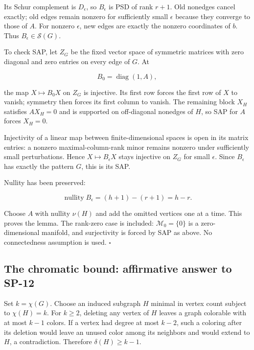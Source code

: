 \documentclass[10pt,a4paper]{article}
\begin{document}
Its Schur complement is \(D_\epsilon\), so \(B_\epsilon\) is PSD of rank
\(r+1\). Old nonedges cancel exactly; old edges remain nonzero for
sufficiently small \(\epsilon\) because they converge to those of \(A\).
For nonzero \(\epsilon\), new edges are exactly the nonzero coordinates
of \(b\). Thus \(B_\epsilon\in\mathcal S(G)\).

To check SAP, let \(Z_G\) be the fixed vector space of symmetric
matrices with zero diagonal and zero entries on every edge of \(G\). At

\[B_0=\operatorname{diag}(1,A),\]

the map \(X\mapsto B_0X\) on \(Z_G\) is injective. Its first row forces
the first row of \(X\) to vanish; symmetry then forces its first column
to vanish. The remaining block \(X_H\) satisfies \(AX_H=0\) and is
supported on off-diagonal nonedges of \(H\), so SAP for \(A\) forces
\(X_H=0\).

Injectivity of a linear map between finite-dimensional spaces is open in
its matrix entries: a nonzero maximal-column-rank minor remains nonzero
under sufficiently small perturbations. Hence \(X\mapsto B_\epsilon X\)
stays injective on \(Z_G\) for small \(\epsilon\). Since \(B_\epsilon\)
has exactly the pattern \(G\), this is its SAP.

Nullity has been preserved:

\[
\operatorname{nullity}B_\epsilon=(h+1)-(r+1)=h-r.
\]

Choose \(A\) with nullity \(\nu(H)\) and add the omitted vertices one at
a time. This proves the lemma. The rank-zero case is included:
\(\mathcal M_0=\{0\}\) is a zero-dimensional manifold, and surjectivity
is forced by SAP as above. No connectedness assumption is used.
\(\square\)


\subsection{The chromatic bound: affirmative answer to
SP-12}\label{the-chromatic-bound-affirmative-answer-to-sp-12}

Set \(k=\chi(G)\). Choose an induced subgraph \(H\) minimal in vertex
count subject to \(\chi(H)=k\). For \(k\ge2\), deleting any vertex of
\(H\) leaves a graph colorable with at most \(k-1\) colors. If a vertex
had degree at most \(k-2\), such a coloring after its deletion would
leave an unused color among its neighbors and would extend to \(H\), a
contradiction. Therefore \(\delta(H)\ge k-1\).
\end{document}
